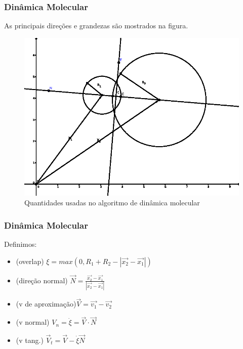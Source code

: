 \documentclass{beamer}
\begin{document}
\begin{frame}
	\frametitle{Dinâmica Molecular}
	As principais direções e grandezas são mostrados na figura.
	\begin{figure}
		\includegraphics[scale=0.5]{./images/fig_1-1.eps}
		\caption{Quantidades usadas no algoritmo de dinâmica molecular}
		\label{fig:1-1}
	\end{figure}
\end{frame}

\begin{frame}
	\frametitle{Dinâmica Molecular}
	Definimos:	
	\begin{itemize}
		\item (overlap) $\xi = max(0, R_1 + R_2 - |\vec{x_2} - \vec{x_1} |)$
		\item (direção normal) $\vec{N} = \frac{\vec{x_2} - \vec{x_1} }{|\vec{x_2} - \vec{x_1} |}$
		\item (v de aproximação)$\vec{V} = \vec{v_1} - \vec{v_2}$
		\item (v normal)  $V_n = \dot{\xi} = \vec{V} \cdot \vec{N} $
		\item (v tang.)  $\vec{V}_t = \vec{V} - \dot{\xi}\vec{N} $
	\end{itemize}
\end{frame}
\end{document}
